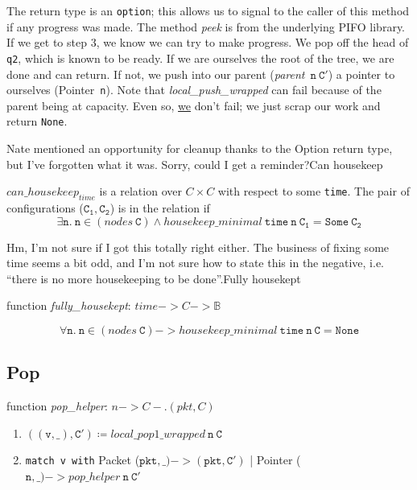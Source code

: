 \documentclass{article}
\newcommand{\note}[2]{{\color{blue} #1}{\marginpar{\color{blue}AM}}}
\begin{document}
The return type is an \texttt{option}; this allows us to signal to the caller
of this method if any progress was made.
The method \textit{peek} is from the underlying PIFO library. 
If we get to step 3, we know we can try to make progress.
We pop off the head of \texttt{q2}, which is known to be ready.
If we are ourselves the root of the tree, we are done and can return.
If not, we push into our parent (\textit{parent}~$\mathtt{n~C'}$) 
a pointer to ourselves (Pointer~\texttt{n}).
Note that \textit{local\_push\_wrapped} can fail because of the parent being at capacity.  
Even so, \underline{we} don't fail; we just scrap our work and return \texttt{None}.

\note{Nate mentioned an opportunity for cleanup thanks to the Option return type, 
but I've forgotten what it was. Sorry, could I get a reminder?}

\subsection{Can housekeep}

$\mathit{can\_housekeep_{time}}$ is a relation over $\mathit{C} \times \mathit{C}$
with respect to some \texttt{time}. 
The pair of configurations ($\mathtt{C_1}, \mathtt{C_2}$) 
is in the relation if
$$\exists \mathtt{n}.~\mathtt{n} \in (\mathit{nodes}~\mathtt{C}) \wedge \mathit{housekeep\_minimal}~\mathtt{time~n~C_1} = \mathtt{Some~C_2}$$

\note{Hm, I'm not sure if I got this totally right either.
The business of fixing some time seems a bit odd, and I'm not sure how to 
state this in the negative, i.e. ``there is no more housekeeping to be done''.}

\subsection{Fully housekept}

function \textit{fully\_housekept}: $\mathit{time} -> C -> \mathbb{B}$


$$\forall \mathtt{n}.~\mathtt{n} \in (\mathit{nodes}~\mathtt{C}) -> \mathit{housekeep\_minimal}~\mathtt{time~n~C} = \mathtt{None}$$


\subsection{Pop}

function \textit{pop\_helper}: $n -> C -. (\mathit{pkt}, C)$
\begin{enumerate}
\item $\mathtt{((v,\_), C')} \coloneq \mathit{local\_pop1\_wrapped}~\mathtt{n~C}$
\item \texttt{match v with} Packet ($\mathtt{pkt}, \_) -> (\mathtt{pkt}, \mathtt{C'})$ | Pointer ($\mathtt{n}, \_) -> \mathit{pop\_helper}~\mathtt{n~C'}$
\end{enumerate}
\end{document}
